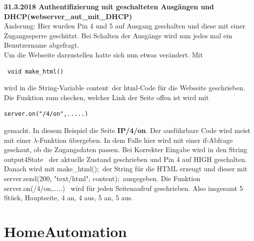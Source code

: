 \documentclass[11pt,fleqn]{book} %
\numberwithin{equation}{section} %
\numberwithin{figure}{section} %
\numberwithin{table}{section} %
\begin{document}
\textbf{\color{red}31.3.2018 Authentifizierung mit geschalteten Ausgängen und DHCP(webserver\_aut\_mit\_DHCP)\color{black}}\\
Änderung: Hier wurden Pin 4 und 5 auf Ausgang geschalten und diese mit einer Zugangssperre geschützt. Bei Schalten der Ausgänge wird nun jedes mal ein Benutzername abgefragt.\\
Um die Webseite darzustellen hatte sich nun etwas verändert. Mit
\begin{lstlisting}
 void make_html()
\end{lstlisting}
wird in die String-Variable \grqq content\grqq \ der html-Code für die Webseite geschrieben. Die Funktion zum checken, welcher Link der Seite offen ist wird mit
\begin{lstlisting}
server.on("/4/on",.....)
\end{lstlisting}
gemacht. In diesem Beispiel die Seite \textbf{IP/4/on}. Der ausführbare Code wird meist mit einer $\lambda$-Funktion übergeben. In dem Falle hier wird mit einer if-Abfrage geschaut, ob die Zugangsdaten passen. Bei Korrekter Eingabe wird in den String \grqq output4State \grqq \ der aktuelle Zustand geschrieben und Pin 4 auf HIGH geschalten. Danach wird mit \grqq make\_html();\grqq \ der String für die HTML erzeugt und dieser mit \grqq server.send(200, "text/html", content);\grqq \ ausgegeben. Die Funktion \grqq server.on(\glqq /4/on\grqq,.....) \grqq \ wird für jeden Seitenaufruf geschrieben. Also insgesamt 5 Stück, Hauptseite, 4 an, 4 aus, 5 an, 5 aus.



\section{HomeAutomation}
\end{document}
